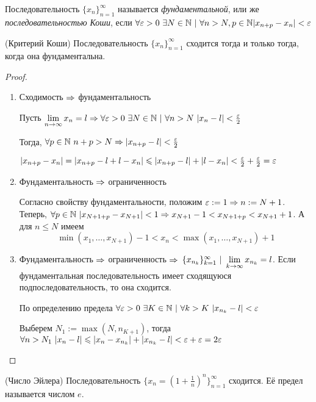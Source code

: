 \begin{definition}
	Последовательность $\{x_n\}_{n = 1}^\infty$ называется \textit{фундаментальной}, или же \textit{последовательностью Коши}, если $\forall \varepsilon > 0\ \exists N \in \mathbb{N}\ |\ \forall n > N, p \in \mathbb{N} |x_{n + p} - x_n| < \varepsilon$
\end{definition}

\begin{theorem} (Критерий Коши)
	Последовательность $\{x_n\}_{n = 1}^\infty$ сходится тогда и только тогда, когда она фундаментальна. 
\end{theorem}

\begin{proof}
	\begin{enumerate}
		\item Сходимость $\Rightarrow$ фундаментальность
		
		Пусть $\lim\limits_{n \rightarrow \infty} x_n = l \Rightarrow \forall \varepsilon > 0\ \exists N \in \mathbb{N}\ |\ \forall n > N\ |x_n - l| < \frac{\varepsilon}{2}$
		
		Тогда, $\forall p \in \mathbb{N}\ n + p > N \Rightarrow |x_{n + p} - l| < \frac{\varepsilon}{2}$
		
		$|x_{n + p} - x_n| = |x_{n + p} - l + l - x_n| \leqslant |x_{n + p} - l| + |l - x_n| < \frac{\varepsilon}{2} + \frac{\varepsilon}{2} = \varepsilon$
		
		\item Фундаментальность $\Rightarrow$ ограниченность
		
		Согласно свойству фундаментальности, положим $\varepsilon := 1 \Rightarrow n := N + 1$. Теперь, $\forall p \in \mathbb{N}\ |x_{N + 1 + p} - x_{N + 1}| < 1 \Rightarrow x_{N + 1} - 1 < x_{N + 1 + p} < x_{N + 1} + 1$. А для $n \le N$ имеем
		$$
			\min(x_1, \dots, x_{N + 1}) - 1 < x_n < \max(x_1, \dots, x_{N + 1}) + 1
 		$$
 		
 		\item Фундаментальность $\Rightarrow$ ограниченность $\Rightarrow$ $\{x_{n_k}\}_{k = 1}^\infty\ |\ \lim\limits_{k \rightarrow \infty} x_{n_k} = l$. Если фундаментальная последовательность имеет сходящуюся подпоследовательность, то она сходится.
 		
 		По определению предела $\forall \varepsilon > 0\ \exists K \in \mathbb{N}\ |\ \forall k > K\ |x_{n_k} - l| < \varepsilon$
 		
 		Выберем $N_1 := \max(N, n_{K + 1})$, тогда $\forall n > N_1 \ |x_n - l| \leqslant |x_n - x_{n_k}| + |x_{n_k} - l| < \varepsilon + \varepsilon = 2\varepsilon$
	\end{enumerate}
\end{proof}

\begin{theorem} (Число Эйлера)
	Последовательность $\{x_n = (1 + \frac{1}{n})^n\}_{n = 1}^\infty$ сходится. Её предел называется числом $e$.
\end{theorem}


